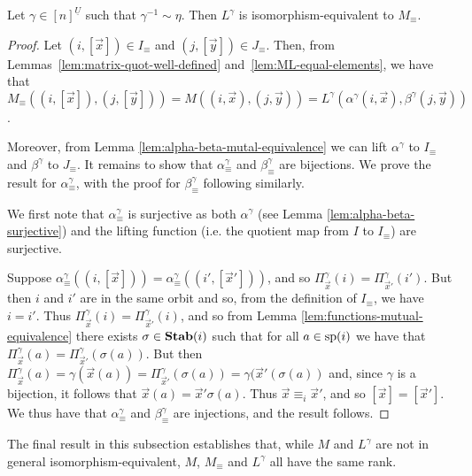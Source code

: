 \documentclass[../paper.tex]{subfiles}
\begin{document}
\begin{thm}
	Let $\gamma \in [n]^{\underline{U}}$ such that $\gamma^{-1} \sim \eta$. Then
  $L^{\gamma}$ is isomorphism-equivalent to $M_{\equiv}$.
	\label{thm:LM-equivalence}
\end{thm}
\begin{proof}
	Let $(i, [\vec{x}]) \in I_\equiv$ and $(j, [\vec{y}]) \in J_\equiv$. Then,
  from Lemmas~\ref{lem:matrix-quot-well-defined}
  and~\ref{lem:ML-equal-elements}, we have that $M_\equiv ((i, [\vec{x}]), (j,
  [\vec{y}])) = M ((i, \vec{x}), (j, \vec{y})) = L^{\gamma}(\alpha^{\gamma}(i,
  \vec{x}), \beta^{\gamma}(j, \vec{y}))$.
		
	Moreover, from Lemma \ref{lem:alpha-beta-mutal-equivalence} we can lift
  $\alpha^\gamma$ to $I_\equiv$ and $\beta^{\gamma}$ to $J_\equiv$. It remains
  to show that $\alpha^\gamma_{\equiv}$ and $\beta^{\gamma}_{\equiv}$ are
  bijections. We prove the result for $\alpha^{\gamma}_{\equiv}$, with the proof
  for $\beta^\gamma_\equiv$ following similarly.
		
	We first note that $\alpha^{\gamma}_{\equiv}$ is surjective as both
  $\alpha^{\gamma}$ (see Lemma \ref{lem:alpha-beta-surjective}) and the lifting
  function (i.e. the quotient map from $I$ to $I_\equiv$) are surjective.
		
	Suppose $\alpha^{\gamma}_\equiv((i, [\vec{x}])) = \alpha^{\gamma}_\equiv((i',
  [\vec{x}']))$, and so $\Pi^{\gamma}_{\vec{x}}(i) =
  \Pi^{\gamma}_{\vec{x}'}(i')$. But then $i$ and $i'$ are in the same orbit and
  so, from the definition of $I_{\equiv}$, we have $i = i'$. Thus
  $\Pi^{\gamma}_{\vec{x}}(i) = \Pi^{\gamma}_{\vec{x}'}(i)$, and so from Lemma
  \ref{lem:functions-mutual-equivalence} there exists $\sigma \in \text{\textbf{Stab}}(i)$ such
  that for all $a \in \text{sp}(i)$ we have that $\Pi^{\gamma}_{\vec{x}}(a) =
  \Pi^{\gamma}_{\vec{x}'} (\sigma (a))$. But then $\Pi^{\gamma}_{\vec{x}}(a) =
  \gamma (\vec{x}(a)) = \Pi^{\gamma}_{\vec{x}'}(\sigma (a)) = \gamma (\vec{x}'
  (\sigma (a))$ and, since $\gamma$ is a bijection, it follows that $\vec{x}(a)
  = \vec{x}' \sigma (a)$. Thus $\vec{x} \equiv_i \vec{x}'$, and so $[\vec{x}] =
  [\vec{x}']$. We thus have that $\alpha^{\gamma}_\equiv$ and
  $\beta^{\gamma}_\equiv$ are injections, and the result follows.
\end{proof}

The final result in this subsection establishes that, while $M$ and $L^{\gamma}$
are not in general isomorphism-equivalent, $M$, $M_\equiv$ and $L^{\gamma}$ all
have the same rank.
\end{document}
